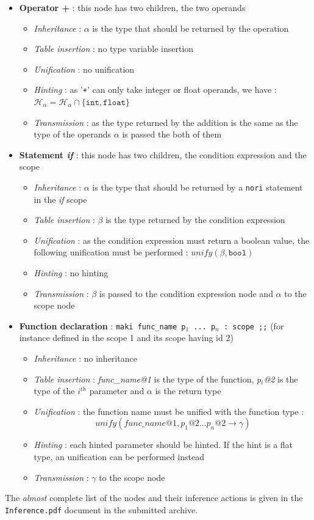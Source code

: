 \documentclass[a4paper,11pt]{article}
\begin{document}
\begin{itemize}
	\item \textbf{Operator +} : this node has two children, the two operands 
	\begin{itemize}
		\item \textit{Inheritance} : $\alpha$ is the type that should be returned by the operation
		\item \textit{Table insertion} : no type variable insertion 
		\item \textit{Unification} : no unification 
		\item \textit{Hinting} : as '\texttt{+}' can only take integer or float operands, we have : $\mathcal{H}_\alpha = \mathcal{H}_\alpha \cap \{\texttt{int}, \texttt{float}\}$
		\item \textit{Transmission} : as the type returned by the addition is the same as the type of the operands $\alpha$ is passed the both of them
	\end{itemize}
	\item \textbf{Statement \textit{if}} : this node has two children, the condition expression and the scope
	\begin{itemize}
		\item \textit{Inheritance} : $\alpha$ is the type that should be returned by a \texttt{nori} statement in the \textit{if} scope
		\item \textit{Table insertion} : $\beta$ is the type returned by the condition expression
		\item \textit{Unification} : as the condition expression must return a boolean value, the following unification must be performed : $unify(\beta, \texttt{bool})$
		\item \textit{Hinting} : no hinting
		\item \textit{Transmission} : $\beta$ is passed to the condition expression node and $\alpha$ to the scope node
	\end{itemize}
	\item \textbf{Function declaration} : \texttt{maki func\_name p$_1$ ... p$_n$ : scope ;;} (for instance defined in the scope 1 and its scope having id 2)
	\begin{itemize}
		\item \textit{Inheritance} : no inheritance
		\item \textit{Table insertion} : \textit{func\_name@1} is the type of the function, \textit{p$_i$@2} is the type of the $i^{th}$ parameter and $\alpha$ is the return type
		\item \textit{Unification} : the function name must be unified with the function type : 
		\[ unify(\textit{func\_name@1}, \textit{p}_1\textit{@2} \hdots \textit{p}_n\textit{@2} \rightarrow \gamma) \]
		\item \textit{Hinting} : each hinted parameter should be hinted. If the hint is a flat type, an unification can be performed instead
		\item \textit{Transmission} : $\gamma$ to the scope node
	\end{itemize}
\end{itemize}
The \textit{almost} complete list of the nodes and their inference actions is given in the \texttt{Inference.pdf} document in the submitted archive.
\end{document}
